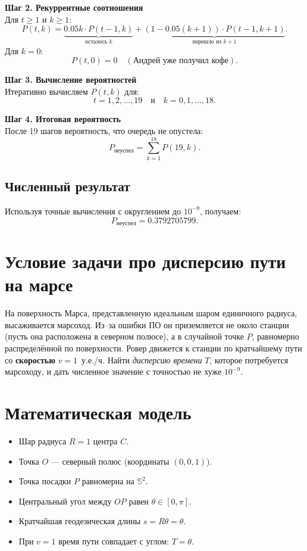 \documentclass{article}
\begin{document}
\textbf{Шаг 2. Рекуррентные соотношения} \\
Для \(t \geq 1\) и \(k \geq 1\):
\[
P(t, k) = \underbrace{0.05k \cdot P(t-1, k)}_{\text{осталось }k} + \underbrace{(1 - 0.05(k+1)) \cdot P(t-1, k+1)}_{\text{перешло из }k+1}.
\]
Для \(k = 0\):
\[
P(t, 0) = 0 \quad (\text{Андрей уже получил кофе}).
\]

\textbf{Шаг 3. Вычисление вероятностей} \\
Итеративно вычисляем \(P(t, k)\) для:
\[
t = 1, 2, \ldots, 19 \quad \text{и} \quad k = 0, 1, \ldots, 18.
\]

\textbf{Шаг 4. Итоговая вероятность} \\
После 19 шагов вероятность, что очередь не опустела:
\[
P_{\text{неуспел}} = \sum_{k=1}^{18} P(19, k).
\]

\subsection*{Численный результат}
Используя точные вычисления с округлением до \(10^{-9}\), получаем:
\[
P_{\text{неуспел}} = \boxed{0.3792705799}.
\]


\section*{Условие задачи про дисперсию пути на марсе}

На поверхность Марса, представленную идеальным шаром единичного радиуса,
высаживается марсоход.
Из--за ошибки ПО он приземляется не около станции (пусть она расположена в северном полюсе),
а в случайной точке $P$, равномерно распределённой по поверхности.
Ровер движется к станции по кратчайшему пути со \textbf{скоростью} $v=1$~у.е./ч.
Найти \emph{дисперсию времени} $T$, которое потребуется марсоходу,
и дать численное значение с точностью не хуже $10^{-9}$.

\section{Математическая модель}

\begin{itemize}
  \item Шар радиуса $R=1$ центра $C$.
  \item Точка $O$ --- северный полюс (координаты $(0,0,1)$).
  \item Точка посадки $P$ равномерна на $\mathbb S^{2}$.
  \item Центральный угол между $OP$ равен $\theta\in[0,\pi]$.
  \item Кратчайшая геодезическая длины $s=R\theta=\theta$.
  \item При $v=1$ время пути совпадает с углом: $T=\theta$.
\end{itemize}
\end{document}
